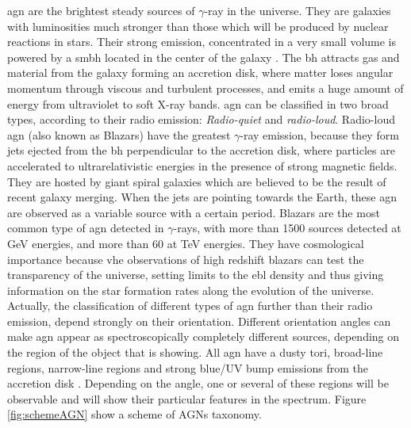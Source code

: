 \documentclass[main.tex]{subfiles}
\begin{document}
\gls{agn} are the brightest steady sources of $\gamma$-ray in the universe. They are galaxies with luminosities much stronger than those which will be produced by nuclear reactions in stars. Their strong emission, concentrated in a very small volume is powered by a \gls{smbh} located in the center of the galaxy \cite{1995AGN}. The \gls{bh} attracts gas and material from the galaxy forming an accretion disk, where matter loses angular momentum through viscous and turbulent processes, and emits a huge amount of energy from ultraviolet to soft X-ray bands. \gls{agn} can be classified in two broad types, according to their radio emission: \textit{Radio-quiet} and \textit{radio-loud}. Radio-loud \gls{agn} (also known as Blazars) have the greatest $\gamma$-ray emission, because they form jets ejected from the \gls{bh} perpendicular to the accretion disk, where particles are accelerated to ultrarelativistic energies in the presence of strong magnetic fields. They are hosted by giant spiral galaxies which are believed to be the result of recent galaxy merging. When the jets are pointing towards the Earth, these \gls{agn} are observed as a variable source with a certain period. Blazars are the most common type of \gls{agn} detected in $\gamma$-rays, with more than 1500 sources detected at GeV energies, and more than 60 at TeV energies. They have cosmological importance because \gls{vhe} observations of high redshift blazars can test the transparency of the universe, setting limits to the \gls{ebl} density and thus giving information on the star formation rates along the evolution of the universe.\\

Actually, the classification of different types of \gls{agn} further than their radio emission, depend strongly on their orientation. Different orientation angles can make \gls{agn} appear as spectroscopically completely different sources, depending on the region of the object that is showing. All \gls{agn} have a dusty tori, broad-line regions, narrow-line regions and strong blue/UV bump emissions from the accretion disk \cite{2016AGNsingammarays}. Depending on the angle, one or several of these regions will be observable and will show their particular features in the spectrum. Figure \ref{fig:schemeAGN} show a scheme of AGNs taxonomy.\\
\end{document}
